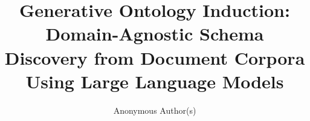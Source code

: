\documentclass[runningheads,a4paper]{llncs}
\begin{document}

\title{Generative Ontology Induction: Domain-Agnostic Schema Discovery
from Document Corpora Using Large Language Models}


\author{Anonymous Author(s)}



\maketitle

\end{document}

